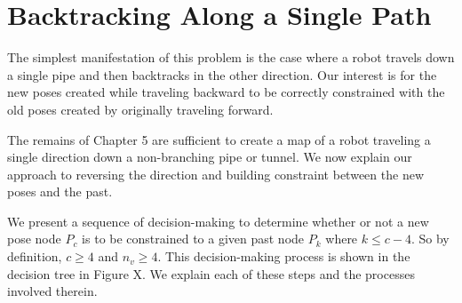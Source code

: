 


\section{Backtracking Along a Single Path}

The simplest manifestation of this problem is the case where a robot travels down a single pipe and then backtracks in the other direction.  Our interest is for the new poses created while traveling backward to be correctly constrained with the old poses created by originally traveling forward.

The remains of Chapter 5 are sufficient to create a map of a robot traveling a single direction down a non-branching pipe or tunnel.  We now explain our approach to reversing the direction and building constraint between the new poses and the past.

We present a sequence of decision-making to determine whether or not a new pose node $P_c$ is to be constrained to a given past node $P_k$ where $k \leq c - 4$.  So by definition, $c \geq 4$ and $n_v \geq 4$.  This decision-making process is shown in the decision tree in Figure X.  We explain each of these steps and the processes involved therein.



%



